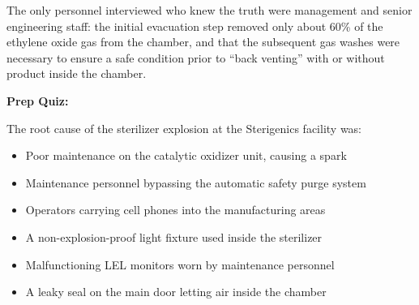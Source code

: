 The only personnel interviewed who knew the truth were management and senior engineering staff: the initial evacuation step removed only about 60\% of the ethylene oxide gas from the chamber, and that the subsequent gas washes were necessary to ensure a safe condition prior to ``back venting'' with or without product inside the chamber.

\vfil \eject

\noindent
{\bf Prep Quiz:}

The root cause of the sterilizer explosion at the Sterigenics facility was:

\begin{itemize}
\item{} Poor maintenance on the catalytic oxidizer unit, causing a spark
\vskip 5pt 
\item{} Maintenance personnel bypassing the automatic safety purge system
\vskip 5pt 
\item{} Operators carrying cell phones into the manufacturing areas
\vskip 5pt 
\item{} A non-explosion-proof light fixture used inside the sterilizer
\vskip 5pt 
\item{} Malfunctioning LEL monitors worn by maintenance personnel
\vskip 5pt 
\item{} A leaky seal on the main door letting air inside the chamber
\end{itemize}





